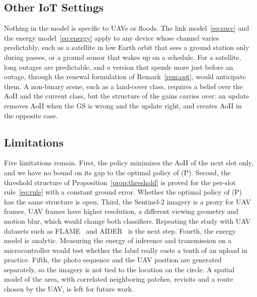 \subsection{Other IoT Settings}
Nothing in the model is specific to UAVs or floods. The link model~\eqref{eq:succ} and the energy model~\eqref{eq:energy} apply to any device whose channel varies predictably, such as a satellite in low Earth orbit that sees a ground station only during passes, or a ground sensor that wakes up on a schedule. For a satellite, long outages are predictable, and a version that spends more just before an outage, through the renewal formulation of Remark~\ref{rem:opt}, would anticipate them. A non-binary scene, such as a land-cover class, requires a belief over the AoII and the current class, but the structure of the gains carries over: an update removes AoII when the GS is wrong and the update right, and creates AoII in the opposite case.

\subsection{Limitations}
Five limitations remain. First, the policy minimizes the AoII of the next slot only, and we have no bound on its gap to the optimal policy of (P). Second, the threshold structure of Proposition~\ref{prop:threshold} is proved for the per-slot rule~\eqref{eq:rule} with a constant ground error. Whether the optimal policy of (P) has the same structure is open. Third, the Sentinel-2 imagery is a proxy for UAV frames. UAV frames have higher resolution, a different viewing geometry and motion blur, which would change both classifiers. Repeating the study with UAV datasets such as FLAME~\cite{shamsoshoara2021flame} and AIDER~\cite{kyrkou2020aider} is the next step. Fourth, the energy model is analytic. Measuring the energy of inference and transmission on a microcontroller would test whether the label really costs a tenth of an upload in practice. Fifth, the photo sequence and the UAV position are generated separately, so the imagery is not tied to the location on the circle. A spatial model of the area, with correlated neighboring patches, revisits and a route chosen by the UAV, is left for future work.

